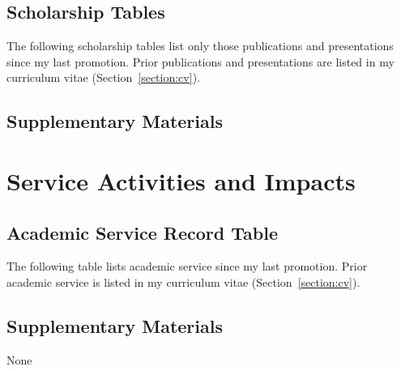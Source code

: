 \documentclass[11pt]{report}
\begin{document}
\chapter{Scholarship Tables}  %
The following scholarship tables list only those publications and presentations since my last promotion.
Prior publications and presentations are listed in my curriculum vitae (Section~\ref{section:cv}).



\chapter{Supplementary Materials}  %

\begin{supplements}[
    directory=supplements/scholarship/,
    structure=enumerate,
    type=publications,
]
\end{supplements}


\part{Service Activities and Impacts}\label{part:service}  %

\chapter{Academic Service Record Table}  %
The following table lists academic service since my last promotion.
Prior academic service is listed in my curriculum vitae (Section~\ref{section:cv}).



\chapter{Supplementary Materials}  %

None




\end{document}
